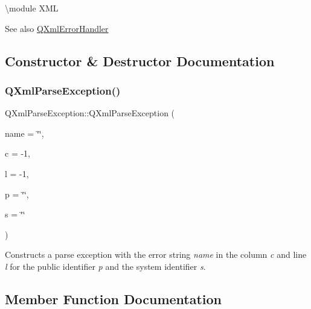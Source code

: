 \textbackslash{}module X\+ML

\begin{DoxySeeAlso}{See also}
\mbox{\hyperlink{class_q_xml_error_handler}{Q\+Xml\+Error\+Handler}} 
\end{DoxySeeAlso}


\subsection{Constructor \& Destructor Documentation}
\mbox{\label{class_q_xml_parse_exception_a3ebf6309461dea4ad1df751e8e95ed2b}} 
\subsubsection{\texorpdfstring{QXmlParseException()}{QXmlParseException()}}
{\footnotesize\ttfamily Q\+Xml\+Parse\+Exception\+::\+Q\+Xml\+Parse\+Exception (\begin{DoxyParamCaption}\item[{const \mbox{\hyperlink{class_q_string}{Q\+String}} \&}]{name = {\ttfamily \char`\"{}\char`\"{}},  }\item[{int}]{c = {\ttfamily -\/1},  }\item[{int}]{l = {\ttfamily -\/1},  }\item[{const \mbox{\hyperlink{class_q_string}{Q\+String}} \&}]{p = {\ttfamily \char`\"{}\char`\"{}},  }\item[{const \mbox{\hyperlink{class_q_string}{Q\+String}} \&}]{s = {\ttfamily \char`\"{}\char`\"{}} }\end{DoxyParamCaption})\hspace{0.3cm}{\ttfamily [inline]}}

Constructs a parse exception with the error string {\itshape name} in the column {\itshape c} and line {\itshape l} for the public identifier {\itshape p} and the system identifier {\itshape s}. 

\subsection{Member Function Documentation}
\mbox{\label{class_q_xml_parse_exception_a0421d03f5e256214046c6141401c7002}} 
